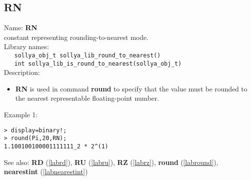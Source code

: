 \subsection{RN}
\label{labrn}
\noindent Name: \textbf{RN}\\
\phantom{aaa}constant representing rounding-to-nearest mode.\\[0.2cm]
\noindent Library names:\\
\verb|   sollya_obj_t sollya_lib_round_to_nearest()|\\
\verb|   int sollya_lib_is_round_to_nearest(sollya_obj_t)|\\[0.2cm]
\noindent Description: \begin{itemize}

\item \textbf{RN} is used in command \textbf{round} to specify that the value must be rounded
   to the nearest representable floating-point number.
\end{itemize}
\noindent Example 1: 
\begin{center}\begin{minipage}{15cm}\begin{Verbatim}[frame=single]
> display=binary!;
> round(Pi,20,RN);
1.100100100001111111_2 * 2^(1)
\end{Verbatim}
\end{minipage}\end{center}
See also: \textbf{RD} (\ref{labrd}), \textbf{RU} (\ref{labru}), \textbf{RZ} (\ref{labrz}), \textbf{round} (\ref{labround}), \textbf{nearestint} (\ref{labnearestint})
